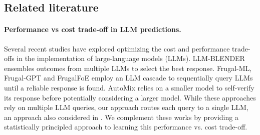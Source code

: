
\subsection{Related literature}
\label{sec:related-work}

\paragraph{Performance vs cost trade-off in LLM predictions.} Several recent studies have explored optimizing the cost and performance trade-offs in the implementation of
large-language models (LLMs). LLM-BLENDER \citep{jiang2023llm} ensembles outcomes from
multiple LLMs to select the best response. Frugal-ML, Frugal-GPT \citep{chen2020frugalml,chen2024frugalgptTMLR} and FrugalFoE \cite{wang2023fusing} employ an LLM cascade to sequentially query LLMs until a reliable response is found. AutoMix \citep{madaan2023automix} relies on a smaller model to self-verify its response before potentially considering a larger model. While these approaches rely
on multiple LLM queries, our approach routes each query to a single LLM, an approach also considered in \citet{hu2024routerbench}. We complement these works by providing a statistically principled approach to learning this performance vs. cost trade-off. 

